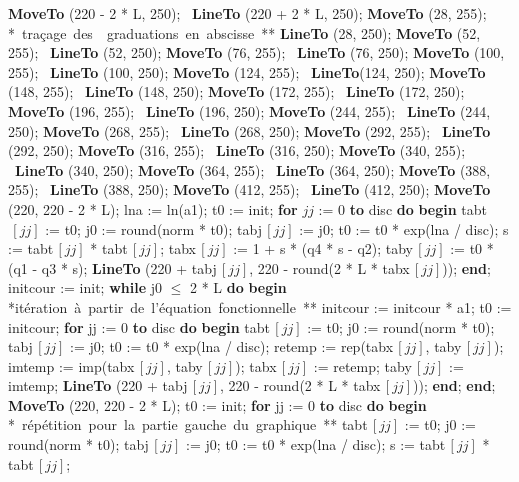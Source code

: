 { {\bf MoveTo} (220 - 2 * L, 250); \  {\bf LineTo} (220 + 2 * L, 250);
\medskip
 {\bf MoveTo} (28, 255);  \q \hbox{\eightpoint ** tra\c{c}age des \ 
graduations en abscisse **}
 {\bf LineTo} (28, 250);
 {\bf MoveTo} (52, 255); \  {\bf LineTo} (52, 250);
 {\bf MoveTo} (76, 255); \  {\bf LineTo} (76, 250);
 {\bf MoveTo} (100, 255); \  {\bf LineTo} (100, 250);
 {\bf MoveTo} (124, 255); \  {\bf LineTo}(124, 250);
 {\bf MoveTo} (148, 255); \  {\bf LineTo} (148, 250);
 {\bf MoveTo} (172, 255); \  {\bf LineTo} (172, 250);
 {\bf MoveTo} (196, 255); \  {\bf LineTo} (196, 250);
 {\bf MoveTo} (244, 255); \  {\bf LineTo} (244, 250);
 {\bf MoveTo} (268, 255); \  {\bf LineTo} (268, 250);
 {\bf MoveTo} (292, 255); \  {\bf LineTo} (292, 250);
 {\bf MoveTo} (316, 255); \  {\bf LineTo} (316, 250);
 {\bf MoveTo} (340, 255); \  {\bf LineTo} (340, 250);
 {\bf MoveTo} (364, 255); \  {\bf LineTo} (364, 250);
 {\bf MoveTo} (388, 255); \  {\bf LineTo} (388, 250);
 {\bf MoveTo} (412, 255); \  {\bf LineTo} (412, 250);
\medskip
 {\bf MoveTo} (220, 220 - 2 * L); 
\medskip
 lna := ln(a1);
\medskip
 t0 := init;
 {\bf for} $jj$ := 0 {\bf to} disc {\bf do}  
\smallskip
  {\bf begin} 
   tabt$\, [jj]$ := t0;
   j0 := round(norm * t0);
   tabj$\, [jj]$ := j0;
   t0 := t0 * exp(lna / disc);
   s := tabt$\, [jj]$ * tabt$\, [jj]$;
   tabx$\, [jj]$ := 1 + s * (q4 * s - q2);
   taby$\, [jj]$ := t0 * (q1 - q3 * s);
   {\bf LineTo} (220 + tabj$\, [jj]$, 220 - round(2 * L * tabx$\, [jj]$));
  {\bf end};
\medskip
 initcour := init;
\medskip
 {\bf while} j0 $\leq$ 2 * L {\bf do}
\smallskip
  {\bf begin} \q \hbox{\eightpoint  **it\'eration \`a partir de\ 
l'\'equation fonctionnelle **}
   initcour := initcour * a1;
   t0 := initcour;
   {\bf for} jj := 0 {\bf to} disc {\bf do}
\smallskip
    {\bf begin}
     tabt$\, [jj]$ := t0;
     j0 := round(norm * t0);
     tabj$\, [jj]$ := j0;
     t0 := t0 * exp(lna / disc);
     retemp := rep(tabx$\, [jj]$, taby$\, [jj]$);
     imtemp := imp(tabx$\, [jj]$, taby$\, [jj]$);
     tabx$\, [jj]$ := retemp;
     taby$\, [jj]$ := imtemp;
     {\bf LineTo} (220 + tabj$\, [jj]$, 220 - round(2 * L * tabx$\, [jj]$));
    {\bf end};
\medskip
  {\bf end};
\medskip
 {\bf MoveTo} (220, 220 - 2 * L);
\medskip
 t0 := init;
 {\bf for} jj := 0 {\bf to} disc {\bf do}
\smallskip
 {\bf begin} \q \hbox{\eightpoint  ** r\'ep\'etition pour la partie\  
gauche du graphique **}
   tabt$\, [jj]$ := t0;
   j0 := round(norm * t0);
   tabj$\, [jj]$ := j0;
   t0 := t0 * exp(lna / disc);
   s := tabt$\, [jj]$ * tabt$\, [jj]$;
}
